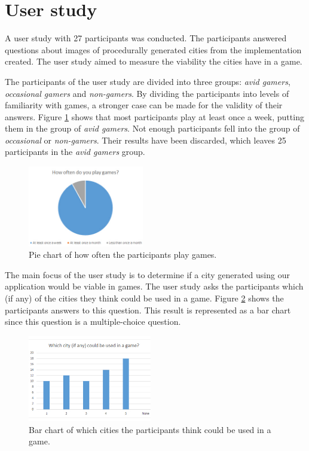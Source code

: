 \section{User study}
	A user study with 27 participants was conducted. The participants answered questions about images of procedurally generated cities from the implementation created. The user study aimed to measure the viability the cities have in a game.
	
	\par
	The participants of the user study are divided into three groups: \textit{avid gamers}, \textit{occasional gamers} and \textit{non-gamers}. By dividing the participants into levels of familiarity with games, a stronger case can be made for the validity of their answers. Figure \ref{fig:pie-chart-often-play} shows that most participants play at least once a week, putting them in the group of \textit{avid gamers}. Not enough participants fell into the group of \textit{occasional} or \textit{non-gamers}. Their results have been discarded, which leaves 25 participants in the \textit{avid gamers} group.
	
	\begin{figure}[h]
		\centering
		\includegraphics[width=0.45\textwidth]{"Images/OftenPlay"}
		\caption{Pie chart of how often the participants play games.}
		\label{fig:pie-chart-often-play}
	\end{figure}
	
	The main focus of the user study is to determine if a city generated using our application would be viable in games. The user study asks the participants which (if any) of the cities they think could be used in a game. Figure \ref{fig:pie-chart-use-in-game} shows the participants answers to this question. This result is represented as a bar chart since this question is a multiple-choice question.
	
	\begin{figure}[h]
		\centering
		\includegraphics[width=0.48\textwidth]{"Images/UseInGame"}
		\caption{Bar chart of which cities the participants think could be used in a game.}
		\label{fig:pie-chart-use-in-game}
	\end{figure}
	
